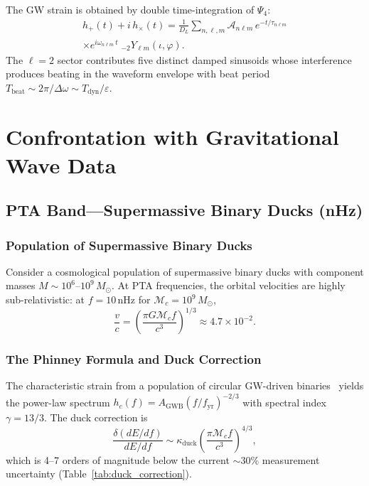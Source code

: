 \documentclass[aps,prd,twocolumn,superscriptaddress,nofootinbib]{revtex4-2}
\newcommand{\Msun}{M_\odot}
\begin{document}
The GW strain is obtained by double time-integration of $\Psi_4$:
\begin{multline}
h_+(t) + i\,h_\times(t) = \frac{1}{D_L}\sum_{n,\ell,m}
\mathcal{A}_{n\ell m}\,e^{-t/\tau_{n\ell m}} \\
\times e^{i\omega_{n\ell m}\,t}\;{}_{-2}Y_{\ell m}(\iota, \varphi).
\end{multline}
The $\ell = 2$ sector contributes five distinct damped sinusoids whose
interference produces beating in the waveform envelope with beat period
$T_{\mathrm{beat}} \sim 2\pi/\Delta\omega \sim T_{\mathrm{dyn}}/\varepsilon$.


\section{Confrontation with Gravitational Wave Data}
\label{sec:obs}

\subsection{PTA Band---Supermassive Binary Ducks (nHz)}
\label{sec:pta}

\subsubsection{Population of Supermassive Binary Ducks}

Consider a cosmological population of supermassive binary ducks with
component masses $M \sim 10^6$--$10^9\, \Msun$.
At PTA frequencies, the orbital velocities are highly sub-relativistic:
at $f = 10\,\mathrm{nHz}$ for $\mathcal{M}_c = 10^9\,\Msun$,
\begin{equation}
\frac{v}{c} = \left( \frac{\pi G \mathcal{M}_c f}{c^3} \right)^{1/3}
\approx 4.7 \times 10^{-2}.
\end{equation}

\subsubsection{The Phinney Formula and Duck Correction}

The characteristic strain from a population of circular GW-driven
binaries~\cite{Phinney2001} yields the power-law spectrum
$h_c(f) = A_{\mathrm{GWB}} (f/f_{\mathrm{yr}})^{-2/3}$
with spectral index $\gamma = 13/3$.
The duck correction is
\begin{equation}
\frac{\delta(dE/df)}{dE/df} \sim \kappa_{\mathrm{duck}} \left(
\frac{\pi \mathcal{M}_c f}{c^3} \right)^{4/3},
\label{eq:duck_correction}
\end{equation}
which is 4--7 orders of magnitude below the current $\sim 30\%$
measurement uncertainty (Table~\ref{tab:duck_correction}).
\end{document}
